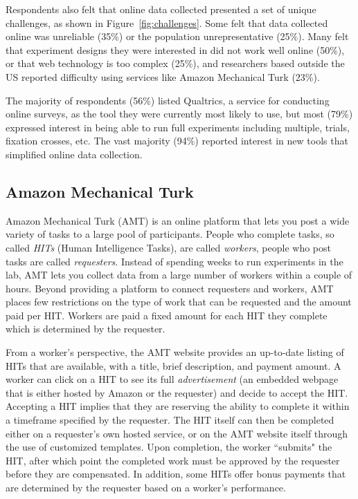 \documentclass[twocolumn]{svjour3}          %
\begin{document}
Respondents also felt that online data collected presented a set of unique challenges, as shown in
Figure~\ref{fig:challenges}. Some felt that data collected online was unreliable (35\%) or the
population unrepresentative (25\%). Many felt that experiment designs they were interested in did
not work well online (50\%), or that web technology is too complex (25\%), and researchers based
outside the US reported difficulty using services like Amazon Mechanical Turk (23\%).


The majority of respondents (56\%) listed Qualtrics, a service for conducting online surveys, as the tool they
were currently most likely to use, but most (79\%) expressed interest in being able to run full
experiments including multiple, trials, fixation crosses, etc. The vast majority (94\%) reported
interest in new tools that simplified online data collection.


\subsection{Amazon Mechanical Turk} 

Amazon Mechanical Turk (AMT) is an online platform that lets you post a wide variety of tasks to a large pool of participants. People
who complete tasks, so called \emph{HITs} (Human Intelligence Tasks), are called \emph{workers}, people who post tasks are called
\emph{requesters}.
Instead of spending weeks to run experiments in the lab, AMT lets you collect data from a large number of workers within a couple of hours.
Beyond providing a platform to connect requesters and workers, AMT places few restrictions on the type of work that can be requested and the amount paid per HIT.
Workers are paid a fixed amount for each HIT they complete which is determined by the requester.

From a worker's perspective, the AMT website provides an up-to-date listing of HITs that are available, with a title, brief description, and payment amount.
A worker can click on a HIT to see its full \emph{advertisement} (an embedded webpage that is either hosted by
Amazon or the requester) and decide to accept the HIT. 
Accepting a HIT implies that they are reserving the ability to complete it within a timeframe specified by the requester.
The HIT itself can then be completed either on a requester's own hosted service, or on the AMT website itself through the use of customized templates.
Upon completion, the worker ``submits" the HIT, after which point the completed work must be approved by the requester before they are compensated.
In addition, some HITs offer bonus payments that are determined by the requester based on a worker's performance.
\end{document}
